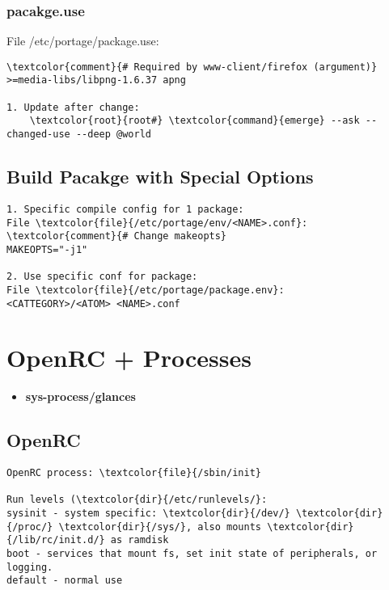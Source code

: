 \documentclass[10pt, a4paper, onecolumn, openany]{book}         %
\begin{document}
\subsection{pacakge.use}
\label{package.use}
File \textcolor{file}{/etc/portage/package.use}:
\begin{Verbatim}[commandchars=\\\{\}]
\textcolor{comment}{# Required by www-client/firefox (argument)}
>=media-libs/libpng-1.6.37 apng

1. Update after change:
    \textcolor{root}{root#} \textcolor{command}{emerge} --ask --changed-use --deep @world
\end{Verbatim}

\section{Build Pacakge with Special Options}
\begin{Verbatim}[commandchars=\\\{\}]
1. Specific compile config for 1 package:
File \textcolor{file}{/etc/portage/env/<NAME>.conf}:
\textcolor{comment}{# Change makeopts}
MAKEOPTS="-j1"

2. Use specific conf for package:
File \textcolor{file}{/etc/portage/package.env}:
<CATTEGORY>/<ATOM> <NAME>.conf
\end{Verbatim}




\chapter{OpenRC + Processes}%
\begin{itemize}
    \item \textbf{sys-process/glances}
\end{itemize}
\section{OpenRC}
\begin{Verbatim}[commandchars=\\\{\}]
OpenRC process: \textcolor{file}{/sbin/init}

Run levels (\textcolor{dir}{/etc/runlevels/}:
sysinit - system specific: \textcolor{dir}{/dev/} \textcolor{dir}{/proc/} \textcolor{dir}{/sys/}, also mounts \textcolor{dir}{/lib/rc/init.d/} as ramdisk
boot - services that mount fs, set init state of peripherals, or logging.
default - normal use
\end{Verbatim}
\end{document}
